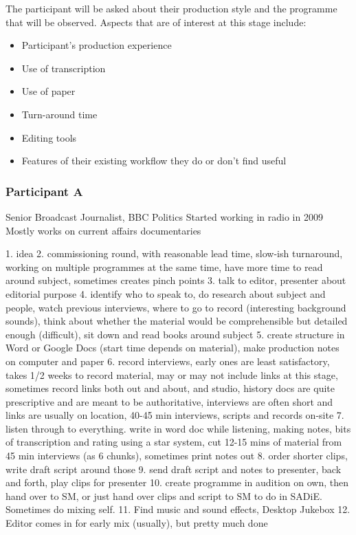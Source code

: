 The participant will be asked about their production style and the programme
that will be observed. Aspects that are of interest at this stage include:
\begin{itemize}
\setlength\itemsep{0em}
\item Participant's production experience
\item Use of transcription
\item Use of paper
\item Turn-around time
\item Editing tools
\item Features of their existing workflow they do or don't find useful
\end{itemize}

\subsubsection{Participant A}
Senior Broadcast Journalist, BBC Politics
Started working in radio in 2009
Mostly works on current affairs documentaries

1. idea
2. commissioning round, with reasonable lead time, slow-ish turnaround, working
on multiple programmes at the same time, have more time to read around subject,
sometimes creates pinch points
3. talk to editor, presenter about editorial purpose
4. identify who to speak to, do research about subject and people, watch
previous interviews, where to go to record (interesting background sounds),
think about whether the material would be comprehensible but detailed enough
(difficult), sit down and read books around subject
5. create structure in Word or Google Docs (start time depends on material),
make production notes on computer and paper
6. record interviews, early ones are least satisfactory, takes 1/2 weeks to
record material, may or may not include links at this stage, sometimes record
links both out and about, and studio, history docs are quite prescriptive and
are meant to be authoritative, interviews are often short and links are usually
on location, 40-45 min interviews, scripts and records on-site
7. listen through to everything. write in word doc while listening, making
notes, bits of transcription and rating using a star system, cut 12-15 mins of
material from 45 min interviews (as 6 chunks), sometimes print notes out
8. order shorter clips, write draft script around those
9. send draft script and notes to presenter, back and forth, play clips for
presenter
10. create programme in audition on own, then hand over to SM, or just hand
over clips and script to SM to do in SADiE. Sometimes do mixing self.
11. Find music and sound effects, Desktop Jukebox
12. Editor comes in for early mix (usually), but pretty much done

